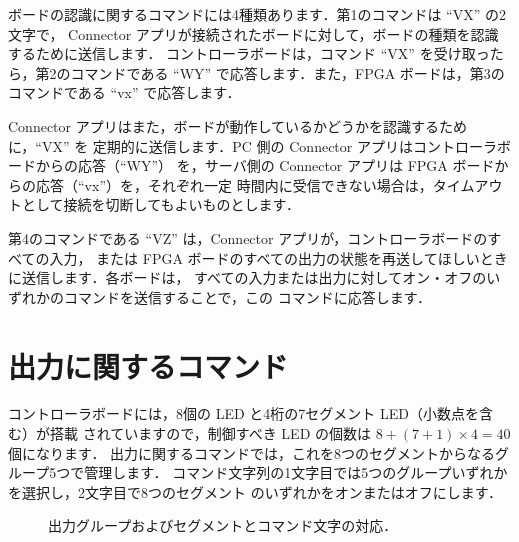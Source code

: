 ボードの認識に関するコマンドには4種類あります．第1のコマンドは ``VX'' の2文字で，
Connector アプリが接続されたボードに対して，ボードの種類を認識するために送信します．
コントローラボードは，コマンド ``VX'' を受け取ったら，第2のコマンドである ``WY''
で応答します．また，FPGA ボードは，第3のコマンドである ``vx'' で応答します．

Connector アプリはまた，ボードが動作しているかどうかを認識するために，``VX'' を
定期的に送信します．PC 側の Connector アプリはコントローラボードからの応答（``WY''）
を，サーバ側の Connector アプリは FPGA ボードからの応答（``vx''）を，それぞれ一定
時間内に受信できない場合は，タイムアウトとして接続を切断してもよいものとします．

第4のコマンドである ``VZ'' は，Connector アプリが，コントローラボードのすべての入力，
または FPGA ボードのすべての出力の状態を再送してほしいときに送信します．各ボードは，
すべての入力または出力に対してオン・オフのいずれかのコマンドを送信することで，この
コマンドに応答します．

\section{出力に関するコマンド}

コントローラボードには，8個の LED と4桁の7セグメント LED（小数点を含む）が搭載
されていますので，制御すべき LED の個数は $8 + (7 + 1) \times 4 = 40$ 個になります．
出力に関するコマンドでは，これを8つのセグメントからなるグループ5つで管理します．
コマンド文字列の1文字目では5つのグループいずれかを選択し，2文字目で8つのセグメント
のいずれかをオンまたはオフにします．

\begin{figure}[ht]
 \centering
 \caption{出力グループおよびセグメントとコマンド文字の対応．}
 \label{fig:Nexys_LED}
\end{figure}


